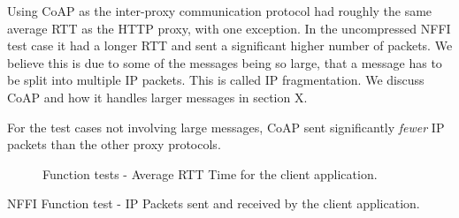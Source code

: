 Using CoAP as the inter-proxy communication protocol had roughly the same
average RTT as the HTTP proxy, with one exception. In the uncompressed NFFI test
case it had a longer RTT and sent a significant higher number of packets. We
believe this is due to some of the messages being so large, that a message has
to be split into multiple IP packets. This is called IP fragmentation. We
discuss CoAP and how it handles larger messages in section X.

For the test cases not involving large messages, CoAP sent significantly
\textit{fewer} IP packets than the other proxy protocols.

\begin{landscape}
    \begin{figure}
    \centering
    \begin{floatrow}
    {
    \caption{Function tests - Average RTT Time for the client application.}
    \label{figure:results-function-testsx}
    }
    \end{floatrow}

    \end{figure}
\end{landscape}


\begin{table}[h]

\caption{NFFI Function test - IP Packets sent and received by the client application.}
\label{table:function-test-packets-nffi}
\end{table}


